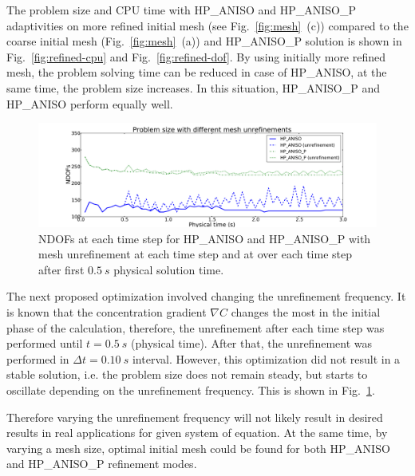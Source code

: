 The problem size and CPU time with HP\_ANISO
and HP\_ANISO\_P adaptivities on more refined initial mesh (see Fig.~\ref{fig:mesh}~(c))
compared to the coarse initial mesh (Fig.~\ref{fig:mesh}~(a)) and 
HP\_ANISO\_P solution is shown in Fig.~\ref{fig:refined-cpu} and Fig.~\ref{fig:refined-dof}.
By using initially more refined mesh, the problem solving time
can be reduced in case of HP\_ANISO, at the same time, the problem size increases.
In this situation, HP\_ANISO\_P and HP\_ANISO perform equally well.

\begin{figure}[!ht]
  \begin{centering}
  \includegraphics[width=\columnwidth]{unreffreq_dof}
  \caption{\label{fig:unreffreq-dof} NDOFs at each time step for
  HP\_ANISO and HP\_ANISO\_P with mesh unrefinement at each time step and at over each
  	time step after first $0.5\ s$ physical solution time.}
  \end{centering}
\end{figure}
The next proposed optimization involved changing the unrefinement frequency.
It is known that the concentration gradient $\nabla C$ changes the most in the initial phase
of the calculation, therefore, the unrefinement after each time step was performed
until $t=0.5\ s$ (physical time). After that, the
unrefinement was performed in $\Delta t = 0.10\ s$ interval.
However, this optimization did not result in a stable solution, i.e. the problem size 
does not remain steady, but starts to oscillate depending on the unrefinement
frequency. This is shown in 
Fig.~\ref{fig:unreffreq-dof}. 

Therefore varying the unrefinement frequency will
not likely result in desired results in real applications for given system of equation.
At the same time, by varying a mesh size, optimal initial mesh could be found
for both HP\_ANISO and HP\_ANISO\_P refinement modes.
	 
